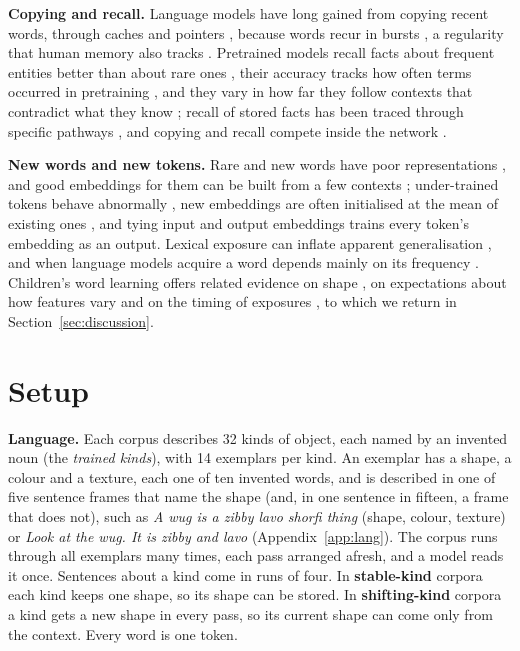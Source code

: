 \documentclass[11pt]{article}
\begin{document}
\textbf{Copying and recall.} Language models have long gained from copying recent words, through caches and pointers \citep{kuhn1990,grave2017,merity2017}, because words recur in bursts \citep{church1995,church2000,madsen2005}, a regularity that human memory also tracks \citep{anderson1991}. Pretrained models recall facts about frequent entities better than about rare ones \citep{mallen2023,kandpal2023}, their accuracy tracks how often terms occurred in pretraining \citep{razeghi2022}, and they vary in how far they follow contexts that contradict what they know \citep{longpre2021,xie2024,du2024}; recall of stored facts has been traced through specific pathways \citep{geva2023}, and copying and recall compete inside the network \citep{yu2023,jin2024,ortu2024}.

\textbf{New words and new tokens.} Rare and new words have poor representations \citep{schick2020}, and good embeddings for them can be built from a few contexts \citep{herbelot2017,khodak2018}; under-trained tokens behave abnormally \citep{land2024}, new embeddings are often initialised at the mean of existing ones \citep{hewitt2021}, and tying input and output embeddings \citep{press2017,inan2017} trains every token's embedding as an output. Lexical exposure can inflate apparent generalisation \citep{kim2022lexical}, and when language models acquire a word depends mainly on its frequency \citep{chang2022}. Children's word learning offers related evidence on shape \citep{landau1988,smith2002}, on expectations about how features vary \citep{kemp2007,dewar2010} and on the timing of exposures \citep{childers2002,schwab2016}, to which we return in Section~\ref{sec:discussion}.

\section{Setup}\label{sec:setup}\label{sec:background}
\textbf{Language.} Each corpus describes 32 kinds of object, each named by an invented noun (the \emph{trained kinds}), with 14 exemplars per kind. An exemplar has a shape, a colour and a texture, each one of ten invented words, and is described in one of five sentence frames that name the shape (and, in one sentence in fifteen, a frame that does not), such as \emph{A wug is a zibby lavo shorfi thing} (shape, colour, texture) or \emph{Look at the wug. It is zibby and lavo} (Appendix~\ref{app:lang}). The corpus runs through all exemplars many times, each pass arranged afresh, and a model reads it once. Sentences about a kind come in runs of four. In \textbf{stable-kind} corpora each kind keeps one shape, so its shape can be stored. In \textbf{shifting-kind} corpora a kind gets a new shape in every pass, so its current shape can come only from the context. Every word is one token.
\end{document}

